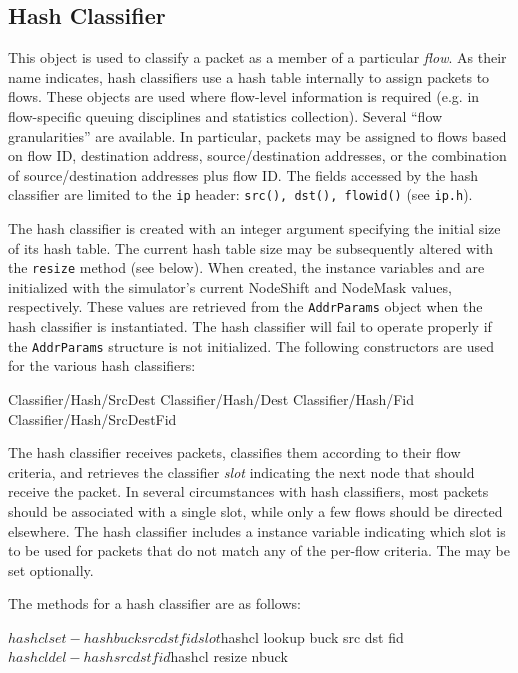 {{\subsection{Hash Classifier}
\label{sec:node:hash-classifier}

This object is used to classify a packet as a member of a
particular {\em flow}.
As their name indicates,
hash classifiers use a hash table internally to assign
packets to flows.
These objects are used where flow-level information is
required (e.g. in flow-specific queuing disciplines and statistics
collection).
Several ``flow granularities'' are available.  In particular,
packets may be assigned to flows based on flow ID, destination address,
source/destination addresses, or the combination of source/destination
addresses plus flow ID.
The fields accessed by the hash classifier are limited to
the {\tt ip} header: {\tt src(), dst(), flowid()} (see {\tt ip.h}).

The hash classifier is created with an integer argument specifying
the initial size of its hash table.  The current hash table size may
be subsequently altered with the {\tt resize} method (see below).
When created, the instance variables  and 
are initialized with the simulator's current {\sf NodeShift} and
{\sf NodeMask} values, respectively.  These values are retrieved
from the {\tt AddrParams} object when the hash classifier is
instantiated.  The hash classifier will fail to operate properly if
the {\tt AddrParams} structure is not initialized.
The following constructors are used for the various hash classifiers:
\begin{program}
        Classifier/Hash/SrcDest
        Classifier/Hash/Dest
        Classifier/Hash/Fid
        Classifier/Hash/SrcDestFid
\end{program}

The hash classifier receives packets, classifies them according
to their flow criteria, and retrieves the classifier {\em slot}
indicating the next node that should receive the packet.
In several circumstances with hash classifiers, most packets should
be associated with a single slot, while only a few flows should
be directed elsewhere. 
The hash classifier includes a  instance variable
indicating which slot is to be used for packets that do not match
any of the per-flow criteria.
The  may be set optionally.

The methods for a hash classifier are as follows:
\begin{program}
        $hashcl set-hash buck src dst fid slot
	$hashcl lookup buck src dst fid
	$hashcl del-hash src dst fid
	$hashcl resize nbuck
\end{program}

}}
